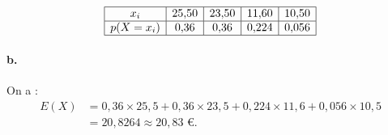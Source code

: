 \documentclass[10pt]{article}
\begin{document}
\[
\begin{array}{|c|c|c|c|c|}
\hline
x_i & 25{,}50 & 23{,}50 & 11{,}60 & 10{,}50 \\
\hline
p(X = x_i) & 0{,}36 & 0{,}36 & 0{,}224 & 0{,}056 \\
\hline
\end{array}
\]

\paragraph{b.} On a :
\begin{align*}
E(X) &= 0{,}36 \times 25{,}5 + 0{,}36 \times 23{,}5 + 0{,}224 \times 11{,}6 + 0{,}056 \times 10{,}5 \\
&= 20{,}8264 \approx 20{,}83 \text{ €}.
\end{align*}
\end{document}
